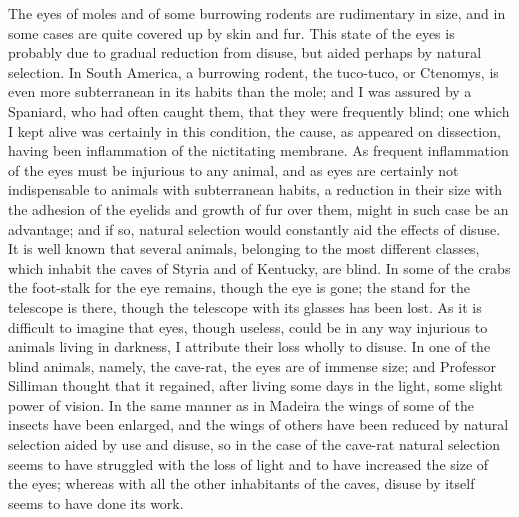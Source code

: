 \indent The eyes of moles and of some burrowing rodents are rudimentary in size, and in some cases are quite covered up by skin and fur. This state of the eyes is probably due to gradual reduction from disuse, but aided perhaps by natural selection. In South America, a burrowing rodent, the tuco-tuco, or Ctenomys, is even more subterranean in its habits than the mole; and I was assured by a Spaniard, who had often caught them, that they were frequently blind; one which I kept alive was certainly in this condition, the cause, as appeared on dissection, having been inflammation of the nictitating membrane. As frequent inflammation of the eyes must be injurious to any animal, and as eyes are certainly not indispensable to animals with subterranean habits, a reduction in their size with the adhesion of the eyelids and growth of fur over them, might in such case be an advantage; and if so, natural selection would constantly aid the effects of disuse.\\
\indent It is well known that several animals, belonging to the most different classes, which inhabit the caves of Styria and of Kentucky, are blind. In some of the crabs the foot-stalk for the eye remains, though the eye is gone; the stand for the telescope is there, though the telescope with its glasses has been lost. As it is difficult to imagine that eyes, though useless, could be in any way injurious to animals living in darkness, I attribute their loss wholly to disuse. In one of the blind animals, namely, the cave-rat, the eyes are of immense size; and Professor Silliman thought that it regained, after living some days in the light, some slight power of vision. In the same manner as in Madeira the wings of some of the insects have been enlarged, and the wings of others have been reduced by natural selection aided by use and disuse, so in the case of the cave-rat natural selection seems to have struggled with the loss of light and to have increased the size of the eyes; whereas with all the other inhabitants of the caves, disuse by itself seems to have done its work.\\
